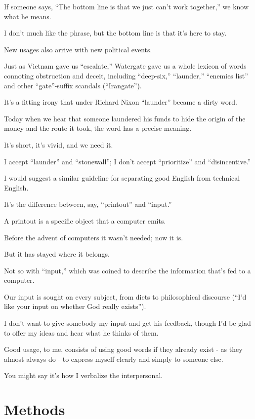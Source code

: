 \documentclass{book}
\numberwithin{equation}{section}
\begin{document}
If someone says, ``The bottom line is that we just can't work together,'' we know what he means.

I don't much like the phrase, but the bottom line is that it's here to stay.

%
New usages also arrive with new political events.

Just as Vietnam gave us ``escalate,'' Watergate gave us a whole lexicon of words connoting obstruction and deceit, including ``deep-six,'' ``launder,'' ``enemies list'' and other ``gate''-suffix scandals (``Irangate'').

It's a fitting irony that under Richard Nixon ``launder'' became a dirty word.

Today when we hear that someone laundered his funds to hide the origin of the money and the route it took, the word has a precise meaning.

It's short, it's vivid, and we need it.

I accept ``launder'' and ``stonewall''; I don't accept ``prioritize'' and ``disincentive.''

%
I would suggest a similar guideline for separating good English from technical English.

It's the difference between, say, ``printout'' and ``input.''

A printout is a specific object that a computer emits.

Before the advent of computers it wasn't needed; now it is.

But it has stayed where it belongs.

Not so with ``input,'' which was coined to describe the information that's fed to a computer.

Our input is sought on every subject, from diets to philosophical discourse (``I'd like your input on whether God really exists'').

%
I don't want to give somebody my input and get his feedback, though I'd be glad to offer my ideas and hear what he thinks of them.

Good usage, to me, consists of using good words if they already exist - as they almost always do - to express myself clearly and simply to someone else.

You might say it's how I verbalize the interpersonal.


\part{Methods}
\end{document}
